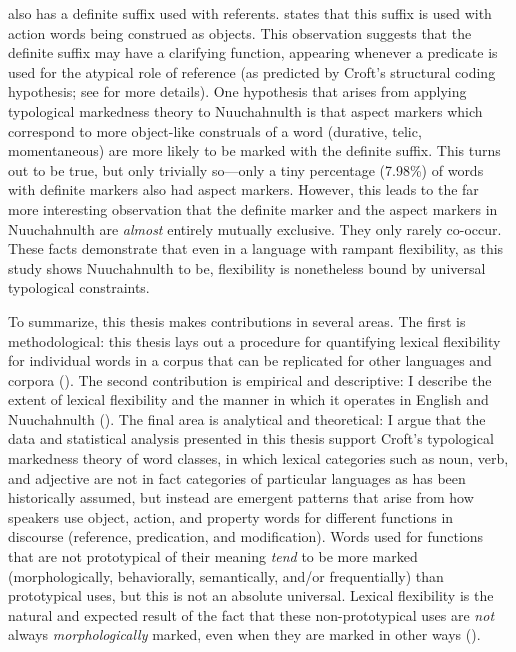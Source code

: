  also has a definite suffix  used with referents. \textcite[48]{Nakayama2001} states that this suffix is used with action words being construed as objects. This observation suggests that the definite suffix may have a clarifying function, appearing whenever a predicate is used for the atypical role of reference (as predicted by Croft's structural coding hypothesis; see  for more details). One hypothesis that arises from applying typological markedness theory to Nuuchahnulth is that aspect markers which correspond to more object-like construals of a word (durative, telic, momentaneous) are more likely to be marked with the definite suffix. This turns out to be true, but only trivially so—only a tiny percentage (7.98\%) of words with definite markers also had aspect markers. However, this leads to the far more interesting observation that the definite marker and the aspect markers in Nuuchahnulth are \emph{almost} entirely mutually exclusive. They only rarely co-occur. These facts demonstrate that even in a language with rampant flexibility, as this study shows Nuuchahnulth to be, flexibility is nonetheless bound by universal typological constraints.

To summarize, this thesis makes contributions in several areas. The first is methodological: this thesis lays out a procedure for quantifying lexical flexibility for individual words in a corpus that can be replicated for other languages and corpora (). The second contribution is empirical and descriptive: I describe the extent of lexical flexibility and the manner in which it operates in English and Nuuchahnulth (). The final area is analytical and theoretical: I argue that the data and statistical analysis presented in this thesis support Croft's typological markedness theory of word classes, in which lexical categories such as noun, verb, and adjective are not in fact categories of particular languages as has been historically assumed, but instead are emergent patterns that arise from how speakers use object, action, and property words for different functions in discourse (reference, predication, and modification). Words used for functions that are not prototypical of their meaning \emph{tend} to be more marked (morphologically, behaviorally, semantically, and/or frequentially) than prototypical uses, but this is not an absolute universal. Lexical flexibility is the natural and expected result of the fact that these non-prototypical uses are \emph{not} always \emph{morphologically} marked, even when they are marked in other ways ().

